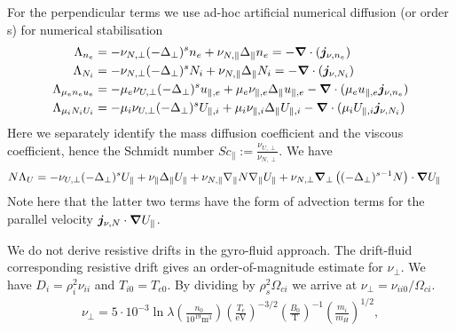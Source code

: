  For the perpendicular terms we use ad-hoc artificial numerical diffusion (or
 order s) for numerical stabilisation %
\begin{align}
\label{eq:perpdiffNU}
\Lambda_{n_e} &=  -\nu_{N,\perp}(-\Delta_\perp)^s n_e + \nu_{N,\parallel}\Delta_\parallel n_e = -{\boldsymbol{\nabla}}\cdot ( {\boldsymbol{j}}_{\nu,n_e}) \\
\Lambda_{N_i} &=  -\nu_{N,\perp}(-\Delta_\perp)^s N_i + \nu_{N,\parallel}\Delta_\parallel N_i= -{\boldsymbol{\nabla}}\cdot ( {\boldsymbol{j}}_{\nu,N_i}) \\
\Lambda_{\mu_e n_e u_e} &=  -\mu_e\nu_{U,\perp}(-\Delta_\perp)^s u_{\parallel,e} + \mu_e \nu_{\parallel,e} \Delta_\parallel u_{\parallel,e}  - {\boldsymbol{\nabla}}\cdot ( \mu_e u_{\parallel,e} {\boldsymbol{j}}_{\nu,n_e})\\
\Lambda_{\mu_i N_i U_i} &=  -\mu_i\nu_{U,\perp}(-\Delta_\perp)^s U_{\parallel,i} + \mu_i \nu_{\parallel,i} \Delta_\parallel U_{\parallel,i}  - {\boldsymbol{\nabla}}\cdot ( \mu_i U_{\parallel,i} {\boldsymbol{j}}_{\nu,N_i})
\end{align}
Here we separately identify the mass diffusion coefficient and the viscous
coefficient, hence the Schmidt number \(\mathit{Sc}_\parallel:=
\frac{\nu_{U,\perp}}{\nu_{N,\perp}}\).
We have
\begin{align}
    N\Lambda_U &=  -\nu_{U,\perp}(-\Delta_\perp)^s U_{\parallel} +  \nu_{\parallel} \Delta_\parallel U_{\parallel}  + \nu_{N,\parallel} \nabla_\parallel N \nabla_\parallel U_{\parallel} + \nu_{N,\perp}{\boldsymbol{\nabla}}_{\perp}\left( (-\Delta_\perp)^{s-1}N\right) \cdot{\boldsymbol{\nabla}} U_{\parallel}
\end{align}
Note here that the latter two terms have the form of advection terms for the parallel velocity ${\boldsymbol{j}}_{\nu,N}\cdot{\boldsymbol{\nabla}} U_\parallel$.

We do not derive resistive drifts in the gyro-fluid approach.
The drift-fluid corresponding resistive drift gives an order-of-magnitude estimate for $\nu_\perp$.
We have  $D_i = \rho_i^2 \nu_{ii}$ and $T_{i0} = T_{e0}$.
By dividing by $\rho_s^2 \Omega_{ci}$ we arrive at $\nu_\perp = \nu_{ii0}/\Omega_{ci}$.
\begin{align}
\nu_\perp =
5\cdot 10^{-3} \ln \lambda
\left(\frac{n_0}{10^{19}\text{m}^3}\right)
\left(\frac{T_e}{\text{eV}}\right)^{-3/2}
\left(\frac{B_0}{\text{T}}\right)^{-1}
\left(\frac{m_i}{m_H}\right)^{1/2},
\end{align}

